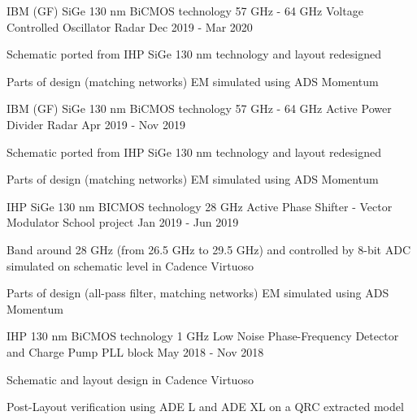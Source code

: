 \begin{cventries}
\cventry
{IBM (GF) SiGe 130 nm BiCMOS technology} %
{57 GHz - 64 GHz Voltage Controlled Oscillator} %
{Radar} %
{Dec 2019 - Mar 2020} %
{ %
\begin{cvitems}
    \item {Schematic ported from IHP SiGe 130 nm technology and layout redesigned}
    \item {Parts of design (matching networks) EM simulated using ADS Momentum}
\end{cvitems} 
}


\cventry
{IBM (GF) SiGe 130 nm BiCMOS technology} %
{57 GHz - 64 GHz Active Power Divider} %
{Radar} %
{Apr 2019 - Nov 2019} %
{ %
\begin{cvitems}
    \item {Schematic ported from IHP SiGe 130 nm technology and layout redesigned}
    \item {Parts of design (matching networks) EM simulated using ADS Momentum}
\end{cvitems} 
}


\cventry
{IHP SiGe 130 nm BICMOS technology} %
{28 GHz Active Phase Shifter - Vector Modulator} %
{School project} %
{Jan 2019 - Jun 2019} %
{ %
\begin{cvitems}
    \item {Band around 28 GHz (from 26.5 GHz to 29.5 GHz) and controlled by 8-bit ADC simulated on schematic level in Cadence Virtuoso}
    \item {Parts of design (all-pass filter, matching networks) EM simulated using ADS Momentum}
\end{cvitems} 
}


\cventry
{IHP 130 nm BiCMOS technology} %
{1 GHz Low Noise Phase-Frequency Detector and Charge Pump} %
{PLL block} %
{May 2018 - Nov 2018} %
{ %
\begin{cvitems}
    \item {Schematic and layout design in Cadence Virtuoso}
    \item {Post-Layout verification using ADE L and ADE XL on a QRC extracted model}
\end{cvitems}
}


\end{cventries}
